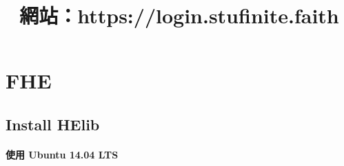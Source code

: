 \documentclass{article}
\title{
\vspace{2in}
\textmd{\textbf{\hmwkClass\ \\  \hmwkTitle}}\\
\vspace{0.1in}\large{\textit{\hmwkClassInstructor}}\\
\vspace{0.1in}
網站：https://login.stufinite.faith
\vspace{2.9in}
}
\author{\textbf{\hmwkAuthorName}}
\date{}
\begin{document}
\maketitle

\newpage

\section{FHE}

\subsection{Install HElib}

\paragraph*{使用 Ubuntu 14.04 LTS}
\end{document}
